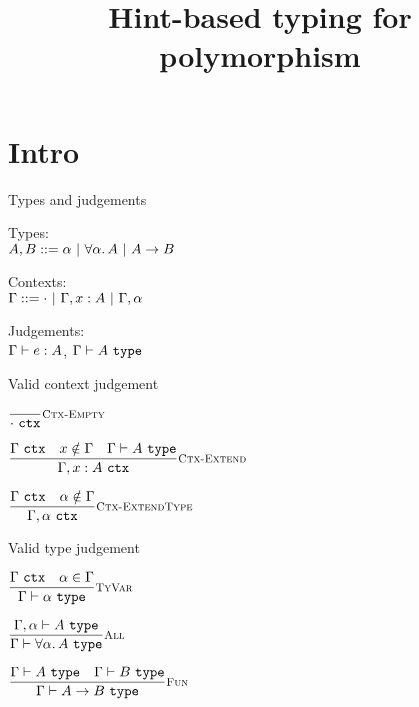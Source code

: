 \documentclass{beamer}
\title{Hint-based typing for polymorphism}
\date{}
\begin{document}
\frame{\titlepage}

\section{Intro}

\begin{frame}{Types and judgements}

Types: \\
$A, B ::= \alpha \pipe \ForallT{\alpha}{A} \pipe \Fun{A}{B}$

\vspace{1em}

Contexts: \\
$\Gamma ::= \emptytypingctx \pipe \extend{\Gamma}{x}{A} \pipe \extendtype{\Gamma}{\alpha}$

\vspace{1em}

Judgements: \\
$\typing{e}{A}$, $\type{A}$

\end{frame}

\begin{frame}{Valid context judgement}

\begin{center}
  $\infrule[Ctx-Empty]{}{\tyctx{\emptytypingctx}}$

  \vspace{2em}

  $\infrule[Ctx-Extend]{\tyctx{\Gamma} \quad \sidecond{x \notin \Gamma} \quad \type{A}}{\tyctx{\extend{\Gamma}{x}{A}}}$

  \vspace{2em}

  $\infrule[Ctx-ExtendType]{\tyctx{\Gamma} \quad \sidecond{\alpha \notin \Gamma}}{\tyctx{\extendtype{\Gamma}{\alpha}}}$
\end{center}

\end{frame}

\begin{frame}{Valid type judgement}

\begin{center}
  $\infrule[TyVar]{\tyctx{\Gamma} \quad \sidecond{\alpha \in \Gamma}}{\type{\alpha}}$

  \vspace{2em}

  $\infrule[All]{\fulltype{\extendtype{\Gamma}{\alpha}}{A}}{\type{\ForallT{\alpha}{A}}}$

  \vspace{2em}

  $\infrule[Fun]{\type{A} \quad \type{B}}{\type{\Fun{A}{B}}}$
\end{center}

\end{frame}
\end{document}
